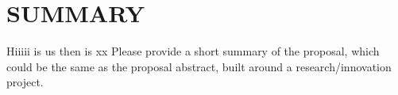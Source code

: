 \documentclass[a4paper,11pt]{article}
\begin{document}


\newpage
\setcounter{tocdepth}{1}
\setcounter{section}{-1}
\tableofcontents


\newpage
\section{SUMMARY}
\label{sec:summary}
Hiiiii \us is \ac{us} then \us is xx
Please provide a short summary of the proposal, which could be the same as the proposal abstract, built around a research/innovation project.


% 


\end{document}

